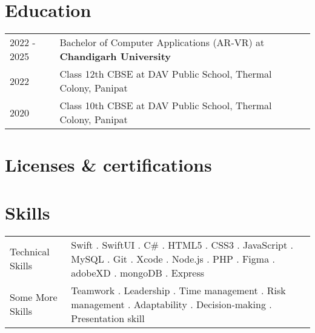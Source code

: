 \documentclass[a4paper,12pt]{article}
\begin{document}
\section{Education}
\begin{tabularx}{\linewidth}{@{}l X@{}}	

2022 - 2025 & Bachelor of Computer Applications (AR-VR) at \textbf{Chandigarh University} \hfill  \\ 

2022 & Class 12th CBSE at DAV Public School, Thermal Colony, Panipat\hfill  \\

2020 & Class 10th CBSE at DAV Public School, Thermal Colony, Panipat \hfill  \\
\end{tabularx}

\section{Licenses \& certifications}
\begin{refsection}
\nocite{*}
\setlength{\bibitemsep}{0.5\baselineskip}
\printbibliography[heading=none]
\end{refsection}


\section{Skills}
\begin{tabularx}{\linewidth}{@{}l X@{}}
Technical Skills  &  \normalsize{Swift . SwiftUI . C\# . HTML5 . CSS3 . JavaScript . MySQL . Git . Xcode . Node.js . PHP . Figma . adobeXD . mongoDB . Express}\\
Some More Skills  &  \normalsize{Teamwork . Leadership . Time management . Risk management . Adaptability . Decision-making . Presentation skill }\\  
\end{tabularx}

\vfill
{}
\end{document}
